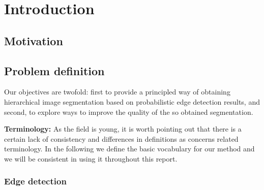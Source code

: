 \chapter{Introduction}
\label{Chapter1}
\section{Motivation}

\section{Problem definition}
Our objectives are  twofold:  first to provide a principled way of obtaining hierarchical image segmentation based on probabilistic edge detection results, and second, to explore ways to improve the quality of the so %
obtained segmentation.

%

\textbf{Terminology:} As the field is young, it is worth pointing out that there is a certain lack of consistency and differences in definitions as concerns related terminology. In the following we define the basic vocabulary for our method and we will be consistent in using it throughout this report.

\subsection{Edge detection}

